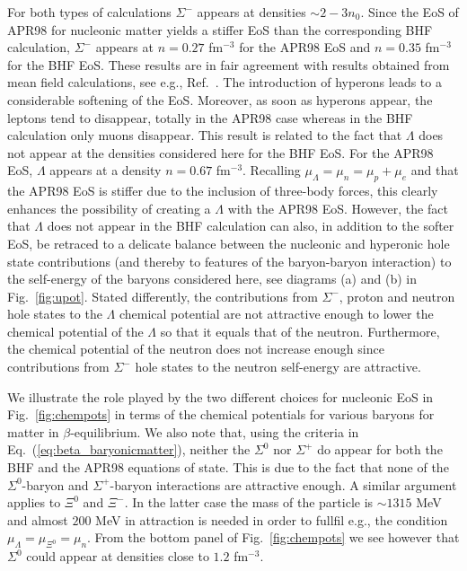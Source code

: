 \begin{multicols}{2}
For both types of calculations $\Sigma^-$ appears at densities $\sim 2-3 n_0$.
Since the  EoS of APR98 for nucleonic matter yields a stiffer EoS than the
corresponding BHF calculation, $\Sigma^-$ appears at 
$n=0.27$ fm$^{-3}$ for the APR98 EoS and $n=0.35$ fm$^{-3}$ for the BHF EoS.
These results are in fair agreement with results obtained from
mean field calculations, see e.g., Ref.\ \cite{prakash97}. The introduction
of hyperons leads to a considerable softening of the EoS. 
Moreover, as soon as hyperons appear, the leptons tend to disappear,
totally in the APR98 case whereas in the BHF calculation only muons disappear.
This result is related to the fact that $\Lambda$ does not appear
at the densities considered here for the BHF EoS.
For the APR98 EoS, $\Lambda$ appears at a density $n=0.67$ fm$^{-3}$.
Recalling $\mu_{\Lambda} = \mu_n = \mu_p + \mu_e$ and that the APR98 EoS is stiffer
due to the inclusion of three-body forces, this 
clearly enhances the possibility of creating a $\Lambda$ with the APR98 EoS. 
However, the fact that
$\Lambda$ does not appear in the BHF calculation can also, in addition to the softer
EoS, 
be retraced to a delicate balance between
the nucleonic and hyperonic hole state contributions
(and thereby to features of the baryon-baryon interaction) 
to the self-energy of the baryons considered here, see diagrams (a) and (b) 
in Fig.\ \ref{fig:upot}. Stated differently, the contributions from $\Sigma^-$,
proton and neutron 
hole states to the $\Lambda$ chemical potential are not attractive enough 
to lower the chemical potential of the $\Lambda$ so that it equals
that of the neutron. Furthermore, the chemical potential of the neutron
does not increase enough since contributions
from $\Sigma^-$ hole states to the neutron self-energy are attractive.  

We illustrate the role played by the two different 
choices for nucleonic EoS in 
Fig.\ \ref{fig:chempots} in terms of the chemical potentials for various baryons 
for matter in $\beta$-equilibrium. 
We also note that, using the criteria in Eq.\ (\ref{eq:beta_baryonicmatter}), 
neither the $\Sigma^0$ nor $\Sigma^+$
do appear for both the BHF and the APR98 equations of state. This is due to  the 
fact that none of the $\Sigma^0$-baryon and  $\Sigma^+$-baryon interactions
are attractive enough. A similar argument  applies to $\Xi^0$ and $\Xi^-$. In the latter
case the mass of the particle is $\sim 1315$ MeV and almost $200$ MeV in attraction
is needed in order to fullfil e.g., the condition 
$\mu_{\Lambda} = \mu_{\Xi^0}= \mu_n$. 
 From the bottom panel of Fig.\ \ref{fig:chempots} we see however that $\Sigma^0$
could appear at densities close to $1.2$ fm$^{-3}$.



\end{multicols}
